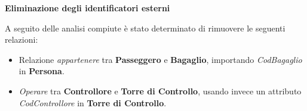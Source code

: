 \textbf{Eliminazione degli identificatori esterni}

\textsf{\small A seguito delle analisi compiute è stato determinato di rimuovere le seguenti relazioni:}\\ %

\begin{itemize} %
	\item \textsf{\small Relazione \emph{appartenere} tra \textbf{Passeggero} e \textbf{Bagaglio}, importando \emph{CodBagaglio} in \textbf{Persona}.}
	\item \textsf{\small \emph{Operare} tra \textbf{Controllore} e \textbf{Torre di Controllo}, usando invece un attributo \emph{CodControllore} in \textbf{Torre di Controllo}.}
	
	

\end{itemize}
